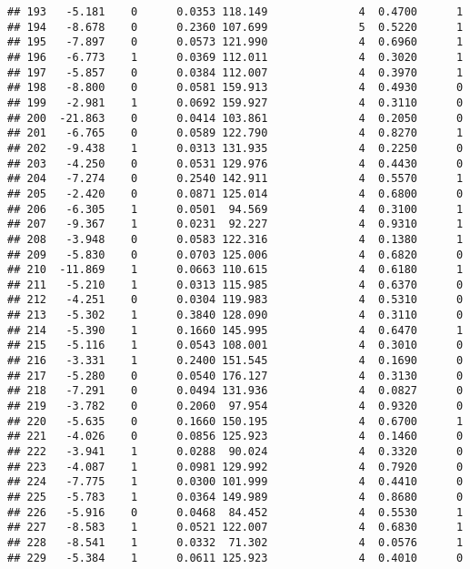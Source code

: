 \documentclass[
]{article}
\begin{document}
\begin{verbatim}
## 193   -5.181    0      0.0353 118.149              4  0.4700      1
## 194   -8.678    0      0.2360 107.699              5  0.5220      1
## 195   -7.897    0      0.0573 121.990              4  0.6960      1
## 196   -6.773    1      0.0369 112.011              4  0.3020      1
## 197   -5.857    0      0.0384 112.007              4  0.3970      1
## 198   -8.800    0      0.0581 159.913              4  0.4930      0
## 199   -2.981    1      0.0692 159.927              4  0.3110      0
## 200  -21.863    0      0.0414 103.861              4  0.2050      0
## 201   -6.765    0      0.0589 122.790              4  0.8270      1
## 202   -9.438    1      0.0313 131.935              4  0.2250      0
## 203   -4.250    0      0.0531 129.976              4  0.4430      0
## 204   -7.274    0      0.2540 142.911              4  0.5570      1
## 205   -2.420    0      0.0871 125.014              4  0.6800      0
## 206   -6.305    1      0.0501  94.569              4  0.3100      1
## 207   -9.367    1      0.0231  92.227              4  0.9310      1
## 208   -3.948    0      0.0583 122.316              4  0.1380      1
## 209   -5.830    0      0.0703 125.006              4  0.6820      0
## 210  -11.869    1      0.0663 110.615              4  0.6180      1
## 211   -5.210    1      0.0313 115.985              4  0.6370      0
## 212   -4.251    0      0.0304 119.983              4  0.5310      0
## 213   -5.302    1      0.3840 128.090              4  0.3110      0
## 214   -5.390    1      0.1660 145.995              4  0.6470      1
## 215   -5.116    1      0.0543 108.001              4  0.3010      0
## 216   -3.331    1      0.2400 151.545              4  0.1690      0
## 217   -5.280    0      0.0540 176.127              4  0.3130      0
## 218   -7.291    0      0.0494 131.936              4  0.0827      0
## 219   -3.782    0      0.2060  97.954              4  0.9320      0
## 220   -5.635    0      0.1660 150.195              4  0.6700      1
## 221   -4.026    0      0.0856 125.923              4  0.1460      0
## 222   -3.941    1      0.0288  90.024              4  0.3320      0
## 223   -4.087    1      0.0981 129.992              4  0.7920      0
## 224   -7.775    1      0.0300 101.999              4  0.4410      0
## 225   -5.783    1      0.0364 149.989              4  0.8680      0
## 226   -5.916    0      0.0468  84.452              4  0.5530      1
## 227   -8.583    1      0.0521 122.007              4  0.6830      1
## 228   -8.541    1      0.0332  71.302              4  0.0576      1
## 229   -5.384    1      0.0611 125.923              4  0.4010      0

\end{verbatim}
\end{document}
